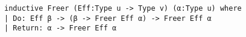 \begin{lstlisting}[language=lean]
inductive Freer (Eff:Type u -> Type v) (α:Type u) where
| Do: Eff β -> (β -> Freer Eff α) -> Freer Eff α
| Return: α -> Freer Eff α
\end{lstlisting}
